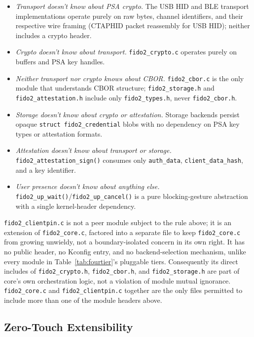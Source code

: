 \begin{itemize}
\item \textit{Transport doesn't know about PSA crypto.} The USB HID and BLE transport implementations operate purely on raw bytes, channel identifiers, and their respective wire framing (CTAPHID packet reassembly for USB HID); neither includes a crypto header.
\item \textit{Crypto doesn't know about transport.} \texttt{fido2\_crypto.c} operates purely on buffers and PSA key handles.
\item \textit{Neither transport nor crypto knows about CBOR.} \texttt{fido2\_cbor.c} is the only module that understands CBOR structure; \texttt{fido2\_storage.h} and \texttt{fido2\_attestation.h} include only \texttt{fido2\_types.h}, never \texttt{fido2\_cbor.h}.
\item \textit{Storage doesn't know about crypto or attestation.} Storage backends persist opaque \texttt{struct fido2\_credential} blobs with no dependency on PSA key types or attestation formats.
\item \textit{Attestation doesn't know about transport or storage.} \texttt{fido2\_attestation\_sign()} consumes only \texttt{auth\_data}, \texttt{client\_data\_hash}, and a key identifier.
\item \textit{User presence doesn't know about anything else.} \texttt{fido2\_up\_wait()}/\texttt{fido2\_up\_cancel()} is a pure blocking-gesture abstraction with a single kernel-header dependency.
\end{itemize}

\texttt{fido2\_clientpin.c} is not a peer module subject to the rule above; it is an extension of \texttt{fido2\_core.c}, factored into a separate file to keep \texttt{fido2\_core.c} from growing unwieldy, not a boundary-isolated concern in its own right. It has no public header, no Kconfig entry, and no backend-selection mechanism, unlike every module in Table~\ref{tab:fourtier}'s pluggable tiers. Consequently its direct includes of \texttt{fido2\_crypto.h}, \texttt{fido2\_cbor.h}, and \texttt{fido2\_storage.h} are part of core's own orchestration logic, not a violation of module mutual ignorance. \texttt{fido2\_core.c} and \texttt{fido2\_clientpin.c} together are the only files permitted to include more than one of the module headers above.

\subsection{Zero-Touch Extensibility}
\label{subsec:arch-extensibility}

